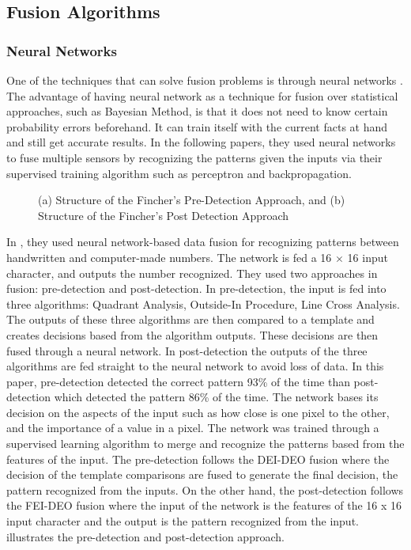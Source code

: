 \subsection{Fusion Algorithms}
\subsubsection {Neural Networks}
One of the techniques that can solve fusion problems is through neural networks . The advantage of having neural network as a technique for fusion over statistical approaches, such as Bayesian Method, is that it does not need to know certain probability errors beforehand. It can train itself with the current facts at hand and still get accurate results.  In the following papers, they used neural networks to fuse multiple sensors by recognizing the patterns given the inputs via their supervised training algorithm such as perceptron and backpropagation.
 
\begin{figure}[h]
	\centering
	\captionsetup{justification=centering}
	\caption{(a) Structure of the Fincher’s Pre-Detection Approach, and (b) Structure of the Fincher’s Post Detection Approach}
	\label{fig:fincher_approach}
\end{figure}

In , they used neural network-based data fusion for recognizing patterns between handwritten and computer-made numbers. The network is fed a 16 $\times$ 16 input character, and outputs the number recognized. They used two approaches in fusion: pre-detection and post-detection. In pre-detection, the input is fed into three algorithms: Quadrant Analysis, Outside-In Procedure, Line Cross Analysis. The outputs of these three algorithms are then compared to a template and creates decisions based from the algorithm outputs. These decisions are then fused through a neural network. In post-detection the outputs of the three algorithms are fed straight to the neural network to avoid loss of data. In this paper, pre-detection detected the correct pattern 93\% of the time than post-detection which detected the pattern 86\% of the time. The network bases its decision on the aspects of the input such as how close is one pixel to the other, and the importance of a value in a pixel. The network was trained through a supervised learning algorithm to merge and recognize the patterns based from the features of the input. The pre-detection follows the DEI-DEO fusion where the decision of the template comparisons are fused to generate the final decision, the pattern recognized from the inputs. On the other hand, the post-detection follows the FEI-DEO fusion where the input of the network is the features of the 16 x 16 input character and the output is the pattern recognized from the input.  illustrates the pre-detection and post-detection approach.

